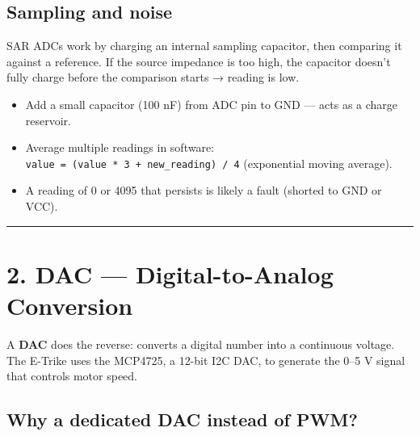 \documentclass[12pt,a4paper,oneside]{report}
\providecommand{\tightlist}{\setlength{\itemsep}{0pt}\setlength{\parskip}{0pt}}
\begin{document}
\subsection{Sampling and noise}\label{sampling-and-noise}

SAR ADCs work by charging an internal sampling capacitor, then comparing it
against a reference. If the source impedance is too high, the capacitor doesn't
fully charge before the comparison starts → reading is low.

\begin{itemize}
\tightlist
\item
  Add a small capacitor (100 nF) from ADC pin to GND --- acts as a charge
  reservoir.
\item
  Average multiple readings in software:
  \texttt{value\ =\ (value\ *\ 3\ +\ new\_reading)\ /\ 4} (exponential moving
  average).
\item
  A reading of 0 or 4095 that persists is likely a fault (shorted to GND or
  VCC).
\end{itemize}

\begin{center}\rule{0.5\linewidth}{0.5pt}\end{center}

\section{2. DAC --- Digital-to-Analog
Conversion}\label{dac-digital-to-analog-conversion}

A \textbf{DAC} does the reverse: converts a digital number into a continuous
voltage. The E-Trike uses the MCP4725, a 12-bit I2C DAC, to generate the 0--5 V
signal that controls motor speed.

\subsection{Why a dedicated DAC instead of
PWM?}\label{why-a-dedicated-dac-instead-of-pwm}
\end{document}
